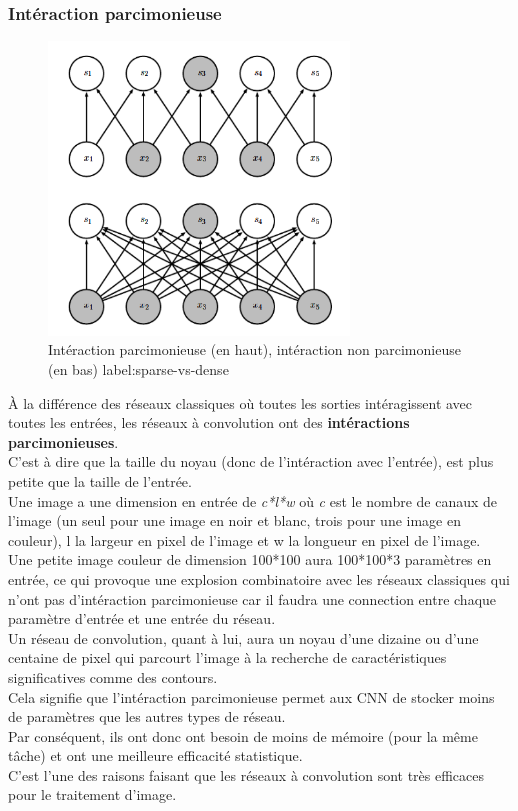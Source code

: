 \documentclass[11pt]{article}
\begin{document}
\subsubsection{Intéraction parcimonieuse}
\label{sec:orgf9b2af6}
\begin{figure}[htbp]
\centering
\includegraphics[width=8cm]{sparse_vs_dense.png}
\caption{Intéraction parcimonieuse (en haut), intéraction non parcimonieuse (en bas) label:sparse-vs-dense}
\end{figure}

À la différence des réseaux classiques où toutes les sorties intéragissent avec toutes les entrées, les réseaux à convolution ont des \textbf{intéractions parcimonieuses}.\\
C'est à dire que la taille du noyau (donc de l'intéraction avec l'entrée), est plus petite que la taille de l'entrée.\\
Une image a une dimension en entrée de \emph{c*l*w} où \emph{c} est le nombre de canaux de l'image (un seul pour une image en noir et blanc, trois pour une image en couleur), l la largeur en pixel de l'image et w la longueur en pixel de l'image.\\
Une petite image couleur de dimension 100*100 aura 100*100*3 paramètres en entrée, ce qui provoque une explosion combinatoire avec les réseaux classiques qui n'ont pas d'intéraction parcimonieuse car il faudra une connection entre chaque paramètre d'entrée et une entrée du réseau.\\
Un réseau de convolution, quant à lui, aura un noyau d'une dizaine ou d'une centaine de pixel qui parcourt l'image à la recherche de caractéristiques significatives comme des contours.\\
Cela signifie que l'intéraction parcimonieuse permet aux CNN de stocker moins de paramètres que les autres types de réseau.\\
Par conséquent, ils ont donc ont besoin de moins de mémoire (pour la même tâche) et ont une meilleure efficacité statistique.\\
C'est l'une des raisons faisant que les réseaux à convolution sont très efficaces pour le traitement d'image.\\
\end{document}
